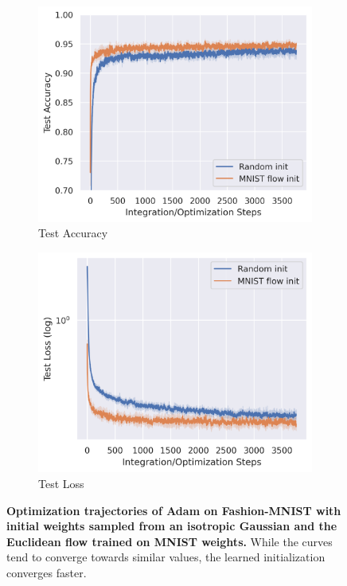 \begin{figure}[t!]
    \centering
    \begin{subfigure}{0.47\linewidth}
        \centering
        \includegraphics[width=\linewidth]{figures/mnist/mnist_init_acc.png}
        \caption{Test Accuracy}
    \end{subfigure}
    \begin{subfigure}{0.47\linewidth}
        \centering
        \includegraphics[width=\linewidth]{figures/mnist/mnist_init_loss.png}
        \caption{Test Loss}
    \end{subfigure}
    \caption{\label{fig:mnist_init}\textbf{Optimization trajectories of Adam on Fashion-MNIST with initial weights sampled from an isotropic Gaussian and the Euclidean flow trained on MNIST weights.} While the curves tend to converge towards similar values, the learned initialization converges faster.} 
\end{figure}

